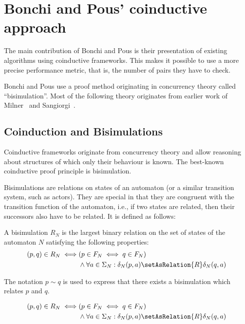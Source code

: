 \section{Bonchi and Pous' coinductive approach}

The main contribution of Bonchi and Pous is their presentation of existing
algorithms using coinductive frameworks. This makes it possible to use a more
precise performance metric, that is, the number of pairs they have to check.

Bonchi and Pous use a proof method originating in concurrency theory called
``bisimulation''. Most of the following theory originates from earlier work of
Milner~\cite{milner1989communication} and Sangiorgi~\cite{sangiorgi1998bisimulation}.

\subsection{Coinduction and Bisimulations}

Coinductive frameworks originate from concurrency theory and allow reasoning
about structures of which only their behaviour is known. The best-known
coinductive proof principle is bisimulation.

Bisimulations are relations on states of an automaton (or a similar transition
system, such as actors). They are special in that they are
congruent with the transition function of the automaton, i.e., if two states are
related, then their successors also have to be related.
It is defined as follows:

\begin{definition}
  A bisimulation $R_N$ is the largest binary relation on the set of states of
  the automaton $N$ satisfying the following properties:
  \begin{align*}
    (p, q) \in R_N \iff &(p \in F_N \iff q \in F_N)\\
      &\land \forall a \in \Sigma_N: \delta_N(p, a) \setAsRelation{R} \delta_N(q, a)
  \end{align*}

  The notation $p \sim q$ is used to express that there exists a bisimulation
  which relates {$p$ and $q$}.
\end{definition}

\begin{definition}
  \begin{align*}
    (p, q) \in R_N \iff &(p \in F_N \iff q \in F_N)\\
      &\land \forall a \in \Sigma_N: \delta_N(p, a) \setAsRelation{R} \delta_N(q, a)
  \end{align*}
\end{definition}

